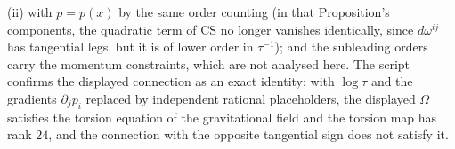 (ii) with $p = p(x)$ by the same order counting (in that Proposition's components, the quadratic term of $\mathrm{CS}$ no longer vanishes identically, since $d\omega^{ij}$ has tangential legs, but it is of lower order in $\tau^{-1}$); and the subleading orders carry the momentum constraints, which are not analysed here. The script confirms the displayed connection as an exact identity: with $\log\tau$ and the gradients $\partial_jp_i$ replaced by independent rational placeholders, the displayed $\Omega$ satisfies the torsion equation of the gravitational field and the torsion map has rank $24$, and the connection with the opposite tangential sign does not satisfy it.
